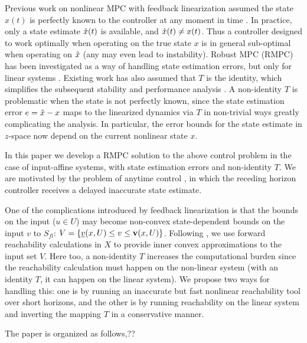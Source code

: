 Previous work on nonlinear MPC with feedback linearization assumed the state $x(t)$ is perfectly known to the controller at any moment in time \cite{SimonLG13_MPC}.
In practice, only a state estimate $\hat{x}(t)$ is available, and $\hat{x}(t) \neq x(t)$.
Thus a controller designed to work optimally when operating on the true state $x$ is in general sub-optimal when operating on $\hat{x}$ (any may even lead to instability).
Robust MPC (RMPC) has been investigated as a way of handling state estimation errors, but only for linear systems \cite{RichardsH05_RMPC}.
Existing work has also assumed that $T$ is the identity, which simplifies the subsequent stability and performance analysis \cite{SimonLG13_MPC}. 
A non-identity $T$ is problematic when the state is not perfectly known, since the state estimation error $e = \hat{x}-x$ maps to the linearized dynamics via $T$ in non-trivial ways greatly complicating the analysis.
In particular, the error bounds for the state estimate in $z$-space now depend on the current nonlinear state $x$.

In this paper we develop a RMPC solution to the above control problem in the case of input-affine systems, with state estimation errors and non-identity $T$.
We are motivated by the problem of anytime control \cite{PantAMNDM15_Anytime}, in which the receding horizon controller receives a delayed inaccurate state estimate.

One of the complications introduced by feedback linearization is that the bounds on the input ($u \in U$) may become non-convex state-dependent bounds on the input $v$ to $S_{fl}$: 
$V = \{\underline{v}(x, U) \leq v \leq \mathbf{v}(x,U)\}$.
Following \cite{SimonLG13_MPC}, we use forward reachability calculations in $X$ to provide inner convex approximations to the input set $V$.
Here too, a non-identity $T$ increases the computational burden since the reachability calculation must happen on the non-linear system (with an identity $T$, it can happen on the linear system).
We propose two ways for handling this: one is by running an inaccurate but fast nonlinear reachability tool over short horizons, and the other is by running reachability on the linear system and inverting the mapping $T$ in a conservative manner.

The paper is organized as follows,??

